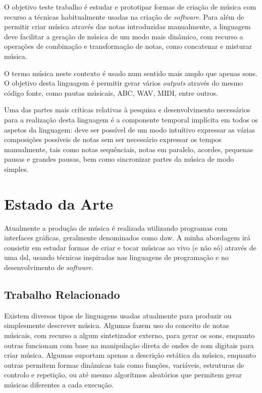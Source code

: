 \documentclass[
  oneside,
  11pt, a4paper,
  footinclude=true,
  headinclude=true,
  cleardoublepage=empty
]{scrbook}
\begin{document}
    O objetivo teste trabalho é estudar e prototipar formas de criação de música com recurso a técnicas habitualmente usadas na criação de \textit{software}. Para além de permitir criar música através das notas introduzidas manualmente, a linguagem deve facilitar a geração de música de um modo mais dinâmico, com recurso a operações de combinação e transformação de notas, como concatenar e misturar música.
    
    O termo música neste contexto é usado num sentido mais amplo que apenas sons. O objetivo desta linguagem é permitir gerar vários \textit{outputs} através do mesmo código fonte, como pautas músicais, ABC, WAV, MIDI, entre outros.

    Uma das partes mais críticas relativas à pesquisa e desenvolvimento necessários para a realização desta linguagem é a componente temporal implícita em todos os aspetos da linguagem: deve ser possível de um modo intuítivo expressar as várias composições possíveis de notas sem ser necessário expressar os tempos manualmente, tais como notas sequênciais, notas em paralelo, acordes, pequenas pausas e grandes pausas, bem como sincronizar partes da música de modo simples.

	\chapter{Estado da Arte}
    Atualmente a produção de música é realizada utilizando programas com interfaces gráficas, geralmente denominados como \acrfull{daw}. A minha abordagem irá consistir em estudar formas de criar e tocar músicas ao vivo (e não só) através de uma \acrfull{dsl}, usando técnicas inspiradas nas linguagens de programação e no desenvolvimento de \textit{software}.

	\section{Trabalho Relacionado}
	Existem diversos tipos de linguagens usadas atualmente para produzir ou simplesmente descrever música. Algumas fazem uso do conceito de notas músicais, com recurso a algum sintetizador externo, para gerar os sons, enquanto outras funcionam com base na manipulação direta de ondes de som digitais para criar música. Algumas suportam apenas a descrição estática da música, enquanto outras permitem formas dinâmicas tais como funções, variáveis, estruturas de controlo e repetição, ou até mesmo algorítmos aleatórios que permitem gerar músicas diferentes a cada execução.
	
\end{document}
